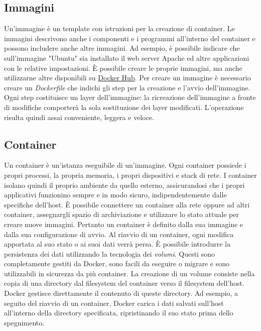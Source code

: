 \subsection{Immagini}
Un'immagine è un template con istruzioni per la creazione di container. Le immagini descrivono anche i componenti e i programmi all'interno del container e possono includere anche altre immagini. Ad esempio, è possibile indicare che sull'immagine "Ubuntu" sia installato il web server Apache ed altre applicazioni con le relative impostazioni. È possibile creare le proprie immagini, ma anche utilizzarne altre disponibili su \hyperref[docker-hub]{Docker Hub}. Per creare un immagine è necessario creare un \emph{Dockerfile} che indichi gli step per la creazione e l'avvio dell'immagine. Ogni step costituisce un layer dell'immagine: la ricreazione dell'immagine a fronte di modifiche comporterà la sola sostituzione dei layer modificati. L'operazione risulta quindi assai conveniente, leggera e veloce.

\subsection{Container}
Un container è un'istanza eseguibile di un'immagine. Ogni container possiede i propri processi, la propria memoria, i propri dispositivi e stack di rete. I container isolano quindi il proprio ambiente da quello esterno, assicurandosi che i propri applicativi funzionino sempre e in modo sicuro, indipendentemente dalle specifiche dell'host. È possibile connettere un container alla rete oppure ad altri container, assegnargli spazio di archiviazione e utilizzare lo stato attuale per creare nuove immagini. Pertanto un container è definito dalla sua immagine e dalla sua configurazione di avvio. Al riavvio di un container, ogni modifica apportata al suo stato o ai suoi dati verrà persa. È possibile introdurre la persistenza dei dati utilizzando la tecnologia dei \emph{volumi}. Questi sono completamente gestiti da Docker, sono facili da eseguire o migrare e sono utilizzabili in sicurezza da più container. La creazione di un volume consiste nella copia di una directory dal filesystem del container verso il filesystem dell'host. Docker gestisce direttamente il contenuto di queste directory. Ad esempio, a seguito del riavvio di un container, Docker carica i dati salvati sull'host all'interno della directory specificata, ripristinando il suo stato prima dello spegnimento.

